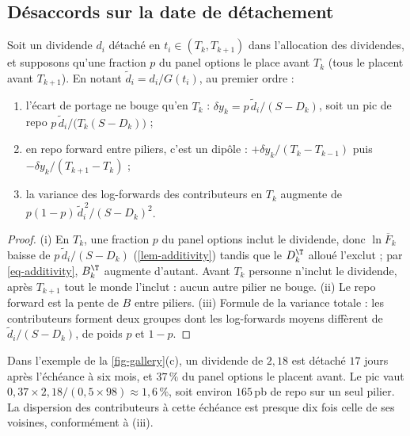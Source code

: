 \subsection{Désaccords sur la date de détachement}
\begin{proposition}\label{prop-timing}
Soit un dividende $d_i$ détaché en $t_i\in(T_k,T_{k+1})$ dans l'allocation des dividendes, et supposons qu'une fraction
$p$ du panel options le place avant $T_k$ (tous le placent avant $T_{k+1}$). En notant $\tilde d_i=d_i/G(t_i)$, au premier
ordre :
\begin{enumerate}[label=(\roman*)]
\item l'écart de portage ne bouge qu'en $T_k$ : $\delta y_k=p\,\tilde d_i/(S-D_k)$, soit un pic de repo
$p\,\tilde d_i/\bigl(T_k(S-D_k)\bigr)$ ;
\item en repo forward entre piliers, c'est un dipôle : $+\delta y_k/(T_k-T_{k-1})$ puis $-\delta y_k/(T_{k+1}-T_k)$ ;
\item la variance des log-forwards des contributeurs en $T_k$ augmente de $p(1-p)\,\tilde d_i^{\,2}/(S-D_k)^2$.
\end{enumerate}
\end{proposition}
\begin{proof}
(i) En $T_k$, une fraction $p$ du panel options inclut le dividende, donc $\ln\overline{F}_k$ baisse de
$p\,\tilde d_i/(S-D_k)$ (\cref{lem-additivity}) tandis que le $D^\T_k$ alloué l'exclut ; par \cref{eq-additivity},
$B^\T_k$ augmente d'autant. Avant $T_k$ personne n'inclut le dividende, après $T_{k+1}$ tout le monde l'inclut :
aucun autre pilier ne bouge. (ii) Le repo forward est la pente de $B$ entre piliers. (iii) Formule de la variance
totale : les contributeurs forment deux groupes dont les log-forwards moyens diffèrent de $\tilde d_i/(S-D_k)$, de poids
$p$ et $1-p$.
\end{proof}

\begin{example}\label{ex-timing}
Dans l'exemple de la \cref{fig-gallery}(c), un dividende de $2{,}18$ est détaché $17$ jours après l'échéance à six mois,
et $37\,\%$ du panel options le placent avant. Le pic vaut $0{,}37\times2{,}18/(0{,}5\times98)\approx1{,}6\,\%$, soit
environ $165$\,pb de repo sur un seul pilier. La dispersion des contributeurs à cette échéance est presque dix fois
celle de ses voisines, conformément à (iii).
\end{example}

